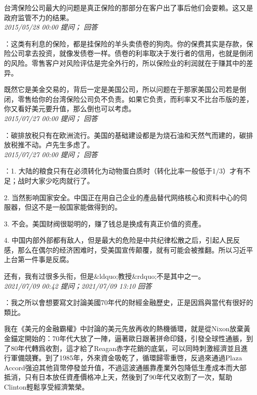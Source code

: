 \documentclass[twocolumn]{ctexart}
\begin{document}
台湾保险公司最大的问题是真正保险的那部分在客户出了事后他们会耍赖。这又是政府监管不力的结果。\\

\textit{\hfill\noindent\small 2015/05/28 00:00 提问； 回答}

：这类有利息的保险，都是挂保险的羊头卖债卷的狗肉。你的保费其实是存款，保险公司拿去投资，就像发债卷一样。债卷的利率取决于发行者的信用，也就是倒闭的风险。零售客户对风险评估是完全外行的，所以保险业的利润就在于赚其中的差异。

既然它是美金交易的，背后一定是美国公司，所以问题在于那家美国公司若是倒闭，零售给你的台湾保险公司负不负责。如果它负责，而利率又不比台币版的差，你又看好美元要升值，那么倒也可以考虑。\\

\textit{\hfill\noindent\small 2015/07/27 00:00 提问； 回答}

：碳排放税只有在欧洲流行。美国的基础建设都是为烧石油和天然气而建的，碳排放税推不动。卢先生多虑了。\\

\textit{\hfill\noindent\small 2015/07/27 00:00 提问； 回答}

：1. 大陆的粮食只有在必须转化为动物蛋白质时（转化比率一般低于1/3）才有不足；战时大家少吃肉就行了。

2. 当然影响国家安全。中国正在用自己企业的產品替代网络核心和资料中心的伺服器，但这不是一般国家能做得到的。

3. 不会。美国财阀很聪明的，赚了钱总是换成有真正价值的资產。

4. 中国内部外部都有敌人，但是最大的危险是中共纪律松散之后，引起人民反感，那么在偶尔的经济困难时，受美国宣传颠覆，就有可能会被推翻。所以习近平上台第一件事是反腐。

还有，我有过很多头衔，但是\&ldquo;教授\&rdquo;不是其中之一。\\

\textit{\hfill\noindent\small 2021/07/09 00:42 提问；2021/07/09 13:10 回答}

：我之所以會想要寫文討論美國70年代的財經金融歷史，正是因爲與當代有很好的類比。

我在《美元的金融霸權》中討論的美元先放再收的熱機循環，就是從Nixon放棄黃金錨定開始的：70年代大放了一陣，逼著歐日跟著拼命印錢，引發全球性通脹，到了80年代轉爲收割，這才給了Reagan赤字花銷的底氣，可以同時刺激經濟並且進行軍備競賽。到了1985年，外來資金吸乾了，循環歸零重啓，反過來通過Plaza Accord强迫其他貨幣停發並升值，不過這波通脹靠產業外包降低生產成本而大部抵消，只有日本放任資產價格冲上天，然後到了90年代又收割了一次，幫助Clinton輕鬆享受經濟繁榮。
\end{document}
